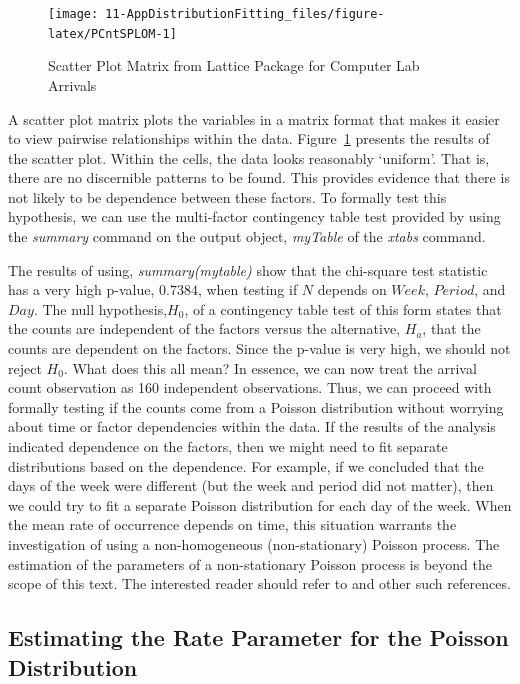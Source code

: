 \documentclass[
]{book}
\theoremstyle{definition}
\theoremstyle{definition}
\theoremstyle{definition}
\theoremstyle{definition}
\theoremstyle{remark}
\begin{document}
\begin{figure}

{\centering \texttt{[image: 11-AppDistributionFitting\_files/figure-latex/PCntSPLOM-1]} 

}

\caption{Scatter Plot Matrix from Lattice Package for Computer Lab Arrivals}\label{fig:PCntSPLOM}
\end{figure}

A scatter plot matrix plots the variables in a matrix format that makes
it easier to view pairwise relationships within the data.
Figure~\ref{fig:PCntSPLOM} presents the results of the
scatter plot. Within the cells, the data looks reasonably `uniform'.
That is, there are no discernible patterns to be found. This provides
evidence that there is not likely to be dependence between these
factors. To formally test this hypothesis, we can use the multi-factor
contingency table test provided by using the \emph{summary} command on the
output object, \emph{myTable} of the \emph{xtabs} command.

The results of using, \emph{summary(mytable)} show that the chi-square test
statistic has a very high p-value, \(0.7384\), when testing if \(N\) depends
on \(Week\), \(Period\), and \(Day\). The null hypothesis,\(H_{0}\), of a
contingency table test of this form states that the counts are
independent of the factors versus the alternative, \(H_{a}\), that the
counts are dependent on the factors. Since the p-value is very high, we
should not reject \(H_{0}\). What does this all mean? In essence, we can
now treat the arrival count observation as 160 independent observations. Thus, we can
proceed with formally testing if the counts come from a Poisson
distribution without worrying about time or factor dependencies within
the data. If the results of the analysis indicated dependence on the
factors, then we might need to fit separate distributions based on the
dependence. For example, if we concluded that the days of the week were
different (but the week and period did not matter), then we could try to
fit a separate Poisson distribution for each day of the week. When the
mean rate of occurrence depends on time, this situation warrants the
investigation of using a non-homogeneous (non-stationary) Poisson
process. The estimation of the parameters of a non-stationary Poisson
process is beyond the scope of this text. The interested reader should
refer to \citep{Leemis1991aa} and other such references.

\hypertarget{estimating-the-rate-parameter-for-the-poisson-distribution}{%
\subsection{Estimating the Rate Parameter for the Poisson Distribution}\label{estimating-the-rate-parameter-for-the-poisson-distribution}}
\end{document}
